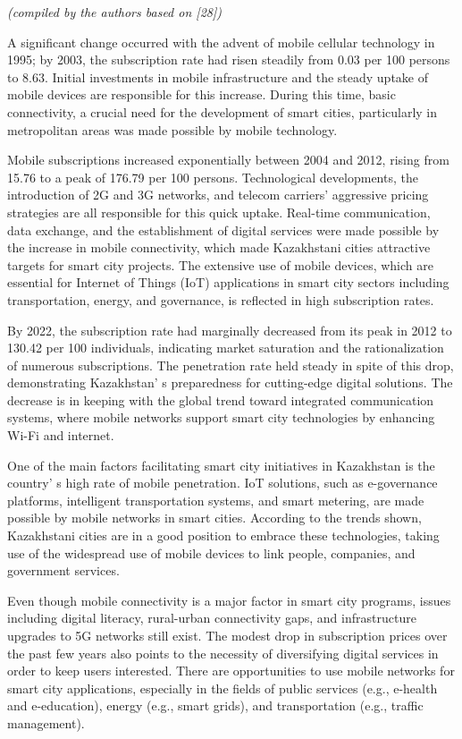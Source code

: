 \emph{(compiled by the authors based on {[}28{]})}

A significant change occurred with the advent of mobile cellular
technology in 1995; by 2003, the subscription rate had risen steadily
from 0.03 per 100 persons to 8.63. Initial investments in mobile
infrastructure and the steady uptake of mobile devices are responsible
for this increase. During this time, basic connectivity, a crucial need
for the development of smart cities, particularly in metropolitan areas
was made possible by mobile technology.

Mobile subscriptions increased exponentially between 2004 and 2012,
rising from 15.76 to a peak of 176.79 per 100 persons. Technological
developments, the introduction of 2G and 3G networks, and telecom
carriers'{} aggressive pricing strategies are all
responsible for this quick uptake. Real-time communication, data
exchange, and the establishment of digital services were made possible
by the increase in mobile connectivity, which made Kazakhstani cities
attractive targets for smart city projects. The extensive use of mobile
devices, which are essential for Internet of Things (IoT) applications
in smart city sectors including transportation, energy, and governance,
is reflected in high subscription rates.

By 2022, the subscription rate had marginally decreased from its peak in
2012 to 130.42 per 100 individuals, indicating market saturation and the
rationalization of numerous subscriptions. The penetration rate held
steady in spite of this drop, demonstrating Kazakhstan' s
preparedness for cutting-edge digital solutions. The decrease is in
keeping with the global trend toward integrated communication systems,
where mobile networks support smart city technologies by enhancing Wi-Fi
and internet.

One of the main factors facilitating smart city initiatives in
Kazakhstan is the country' s high rate of mobile
penetration. IoT solutions, such as e-governance platforms, intelligent
transportation systems, and smart metering, are made possible by mobile
networks in smart cities. According to the trends shown, Kazakhstani
cities are in a good position to embrace these technologies, taking use
of the widespread use of mobile devices to link people, companies, and
government services.

Even though mobile connectivity is a major factor in smart city
programs, issues including digital literacy, rural-urban connectivity
gaps, and infrastructure upgrades to 5G networks still exist. The modest
drop in subscription prices over the past few years also points to the
necessity of diversifying digital services in order to keep users
interested. There are opportunities to use mobile networks for smart
city applications, especially in the fields of public services (e.g.,
e-health and e-education), energy (e.g., smart grids), and
transportation (e.g., traffic management).

